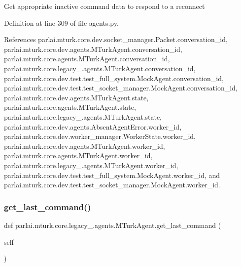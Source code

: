 \begin{DoxyVerb}Get appropriate inactive command data to respond to a reconnect\end{DoxyVerb}
 

Definition at line 309 of file agents.\+py.



References parlai.\+mturk.\+core.\+dev.\+socket\+\_\+manager.\+Packet.\+conversation\+\_\+id, parlai.\+mturk.\+core.\+dev.\+agents.\+M\+Turk\+Agent.\+conversation\+\_\+id, parlai.\+mturk.\+core.\+agents.\+M\+Turk\+Agent.\+conversation\+\_\+id, parlai.\+mturk.\+core.\+legacy\+\_.\+agents.\+M\+Turk\+Agent.\+conversation\+\_\+id, parlai.\+mturk.\+core.\+dev.\+test.\+test\+\_\+full\+\_\+system.\+Mock\+Agent.\+conversation\+\_\+id, parlai.\+mturk.\+core.\+dev.\+test.\+test\+\_\+socket\+\_\+manager.\+Mock\+Agent.\+conversation\+\_\+id, parlai.\+mturk.\+core.\+dev.\+agents.\+M\+Turk\+Agent.\+state, parlai.\+mturk.\+core.\+agents.\+M\+Turk\+Agent.\+state, parlai.\+mturk.\+core.\+legacy\+\_.\+agents.\+M\+Turk\+Agent.\+state, parlai.\+mturk.\+core.\+dev.\+agents.\+Absent\+Agent\+Error.\+worker\+\_\+id, parlai.\+mturk.\+core.\+dev.\+worker\+\_\+manager.\+Worker\+State.\+worker\+\_\+id, parlai.\+mturk.\+core.\+dev.\+agents.\+M\+Turk\+Agent.\+worker\+\_\+id, parlai.\+mturk.\+core.\+agents.\+M\+Turk\+Agent.\+worker\+\_\+id, parlai.\+mturk.\+core.\+legacy\+\_.\+agents.\+M\+Turk\+Agent.\+worker\+\_\+id, parlai.\+mturk.\+core.\+dev.\+test.\+test\+\_\+full\+\_\+system.\+Mock\+Agent.\+worker\+\_\+id, and parlai.\+mturk.\+core.\+dev.\+test.\+test\+\_\+socket\+\_\+manager.\+Mock\+Agent.\+worker\+\_\+id.

\mbox{\label{classparlai_1_1mturk_1_1core_1_1legacy__2018_1_1agents_1_1MTurkAgent_af74c2cb4a0eb7c1e7c9f57346b16bfbb}} 
\subsubsection{\texorpdfstring{get\+\_\+last\+\_\+command()}{get\_last\_command()}}
{\footnotesize\ttfamily def parlai.\+mturk.\+core.\+legacy\+\_.\+agents.\+M\+Turk\+Agent.\+get\+\_\+last\+\_\+command (\begin{DoxyParamCaption}\item[{}]{self }\end{DoxyParamCaption})}

